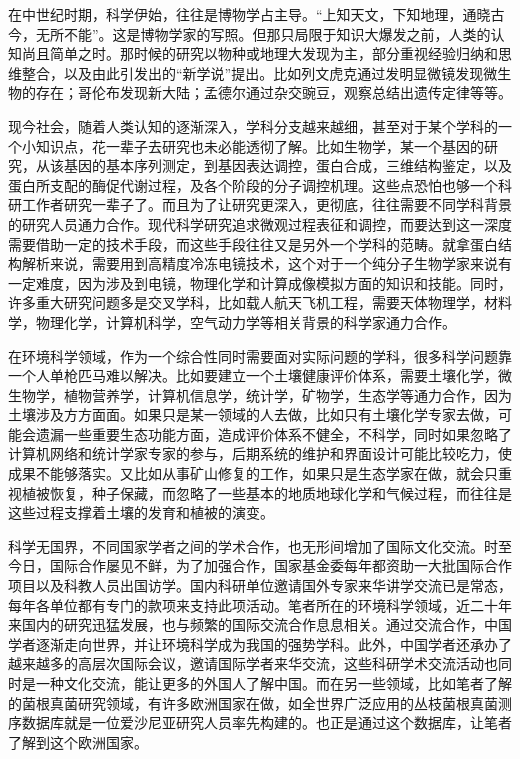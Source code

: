 \documentclass[
]{book}
\begin{document}
在中世纪时期，科学伊始，往往是博物学占主导。``上知天文，下知地理，通晓古今，无所不能''。这是博物学家的写照。但那只局限于知识大爆发之前，人类的认知尚且简单之时。那时候的研究以物种或地理大发现为主，部分重视经验归纳和思维整合，以及由此引发出的``新学说''提出。比如列文虎克通过发明显微镜发现微生物的存在；哥伦布发现新大陆；孟德尔通过杂交豌豆，观察总结出遗传定律等等。

现今社会，随着人类认知的逐渐深入，学科分支越来越细，甚至对于某个学科的一个小知识点，花一辈子去研究也未必能透彻了解。比如生物学，某一个基因的研究，从该基因的基本序列测定，到基因表达调控，蛋白合成，三维结构鉴定，以及蛋白所支配的酶促代谢过程，及各个阶段的分子调控机理。这些点恐怕也够一个科研工作者研究一辈子了。而且为了让研究更深入，更彻底，往往需要不同学科背景的研究人员通力合作。现代科学研究追求微观过程表征和调控，而要达到这一深度需要借助一定的技术手段，而这些手段往往又是另外一个学科的范畴。就拿蛋白结构解析来说，需要用到高精度冷冻电镜技术，这个对于一个纯分子生物学家来说有一定难度，因为涉及到电镜，物理化学和计算成像模拟方面的知识和技能。同时，许多重大研究问题多是交叉学科，比如载人航天飞机工程，需要天体物理学，材料学，物理化学，计算机科学，空气动力学等相关背景的科学家通力合作。

在环境科学领域，作为一个综合性同时需要面对实际问题的学科，很多科学问题靠一个人单枪匹马难以解决。比如要建立一个土壤健康评价体系，需要土壤化学，微生物学，植物营养学，计算机信息学，统计学，矿物学，生态学等通力合作，因为土壤涉及方方面面。如果只是某一领域的人去做，比如只有土壤化学专家去做，可能会遗漏一些重要生态功能方面，造成评价体系不健全，不科学，同时如果忽略了计算机网络和统计学家专家的参与，后期系统的维护和界面设计可能比较吃力，使成果不能够落实。又比如从事矿山修复的工作，如果只是生态学家在做，就会只重视植被恢复，种子保藏，而忽略了一些基本的地质地球化学和气候过程，而往往是这些过程支撑着土壤的发育和植被的演变。

科学无国界，不同国家学者之间的学术合作，也无形间增加了国际文化交流。时至今日，国际合作屡见不鲜，为了加强合作，国家基金委每年都资助一大批国际合作项目以及科教人员出国访学。国内科研单位邀请国外专家来华讲学交流已是常态，每年各单位都有专门的款项来支持此项活动。笔者所在的环境科学领域，近二十年来国内的研究迅猛发展，也与频繁的国际交流合作息息相关。通过交流合作，中国学者逐渐走向世界，并让环境科学成为我国的强势学科。此外，中国学者还承办了越来越多的高层次国际会议，邀请国际学者来华交流，这些科研学术交流活动也同时是一种文化交流，能让更多的外国人了解中国。而在另一些领域，比如笔者了解的菌根真菌研究领域，有许多欧洲国家在做，如全世界广泛应用的丛枝菌根真菌测序数据库就是一位爱沙尼亚研究人员率先构建的。也正是通过这个数据库，让笔者了解到这个欧洲国家。
\end{document}
